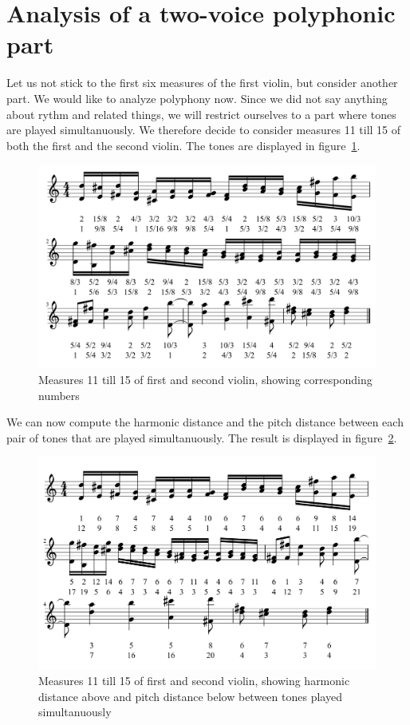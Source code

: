 \documentclass[a4paper]{book}
\theoremstyle{definition}
\begin{document}
\section{Analysis of a two-voice polyphonic part}
Let us not stick to the first six measures of the first violin, but consider another part.
We would like to analyze polyphony now.
Since we did not say anything about rythm and related things, we will restrict ourselves to a part where tones are played simultanuously.
We therefore decide to consider measures 11 till 15 of both the first and the second violin.
The tones are displayed in figure~\ref{fig_first_second_violin_tones}.

\begin{figure}[H]
    \centering
    \includegraphics[scale=0.25]{figures/fig_first_second_violin_tones.png}
    \caption{Measures 11 till 15 of first and second violin, showing corresponding numbers}
    \label{fig_first_second_violin_tones}
\end{figure}

We can now compute the harmonic distance and the pitch distance between each pair of tones that are played simultanuously.
The result is displayed in figure~\ref{fig_first_second_violin_melodic_and_harmonic_distance_self}.

\begin{figure}[H]
    \centering
    \includegraphics[scale=0.25]{figures/fig_first_second_violin_melodic_and_harmonic_distance_self.png}
    \caption{Measures 11 till 15 of first and second violin, showing harmonic distance above and pitch distance below between tones played simultanuously}
    \label{fig_first_second_violin_melodic_and_harmonic_distance_self}
\end{figure}
\end{document}
